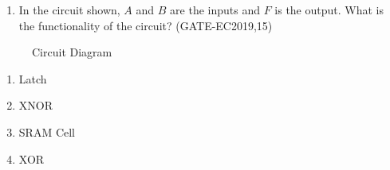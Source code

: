 \documentclass[a4paper ,10pt]{article}
\author{Pooja Sree}
\begin{document}
    \begin{enumerate}
    \item In the circuit shown, $A$ and $B$ are the inputs and $F$ is the output. What is the functionality of the circuit?
   \hfill(GATE-EC2019,15)
    \end{enumerate}
\begin{figure}[H]
\centering

\caption{Circuit Diagram}
\label{fig:block_diagram}
\end{figure}
\begin{enumerate}
\item Latch
\item XNOR
\item SRAM Cell
\item XOR
\end{enumerate}
\end{document}
